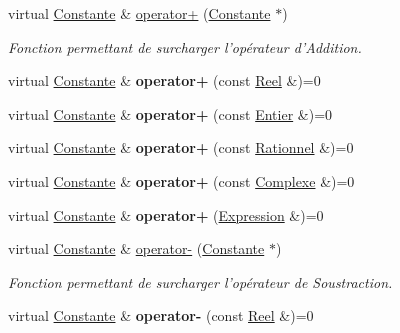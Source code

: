 \begin{DoxyCompactItemize}
\item 
virtual \hyperlink{class_constante}{Constante} \& \hyperlink{class_constante_a2346d7608b9732c34f96d01bed7de6c1}{operator+} (\hyperlink{class_constante}{Constante} $\ast$)
\begin{DoxyCompactList}\small\item\em Fonction permettant de surcharger l'opérateur d'Addition. \end{DoxyCompactList}\item 
\hypertarget{class_constante_adb952a391e582f997a96d848e461e281}{virtual \hyperlink{class_constante}{Constante} \& {\bfseries operator+} (const \hyperlink{class_reel}{Reel} \&)=0}\label{class_constante_adb952a391e582f997a96d848e461e281}

\item 
\hypertarget{class_constante_a2402e4cd1b0d9d9618f05fe5876f090f}{virtual \hyperlink{class_constante}{Constante} \& {\bfseries operator+} (const \hyperlink{class_entier}{Entier} \&)=0}\label{class_constante_a2402e4cd1b0d9d9618f05fe5876f090f}

\item 
\hypertarget{class_constante_ad778cc57ca2edc0bc09dc63455029451}{virtual \hyperlink{class_constante}{Constante} \& {\bfseries operator+} (const \hyperlink{class_rationnel}{Rationnel} \&)=0}\label{class_constante_ad778cc57ca2edc0bc09dc63455029451}

\item 
\hypertarget{class_constante_a753901cb5653de58594c74038536f56b}{virtual \hyperlink{class_constante}{Constante} \& {\bfseries operator+} (const \hyperlink{class_complexe}{Complexe} \&)=0}\label{class_constante_a753901cb5653de58594c74038536f56b}

\item 
\hypertarget{class_constante_a03fc01b8fdf5b8945ae8b72209bc1285}{virtual \hyperlink{class_constante}{Constante} \& {\bfseries operator+} (\hyperlink{class_expression}{Expression} \&)=0}\label{class_constante_a03fc01b8fdf5b8945ae8b72209bc1285}

\item 
virtual \hyperlink{class_constante}{Constante} \& \hyperlink{class_constante_a24a763c775e35399bff4441b2f41db12}{operator-\/} (\hyperlink{class_constante}{Constante} $\ast$)
\begin{DoxyCompactList}\small\item\em Fonction permettant de surcharger l'opérateur de Soustraction. \end{DoxyCompactList}\item 
\hypertarget{class_constante_a6eb6194c90dce85b0e8d55cb39733f6e}{virtual \hyperlink{class_constante}{Constante} \& {\bfseries operator-\/} (const \hyperlink{class_reel}{Reel} \&)=0}\label{class_constante_a6eb6194c90dce85b0e8d55cb39733f6e}


\end{DoxyCompactItemize}
